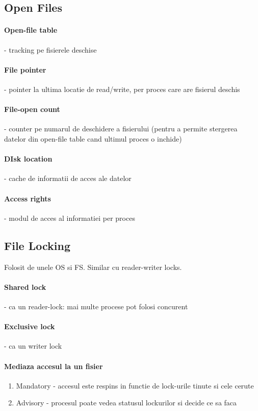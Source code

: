 \documentclass{article}
\begin{document}
\subsection*{Open Files}
\paragraph*{Open-file table} - tracking pe fisierele deschise
\paragraph*{File pointer} - pointer la ultima locatie de read/write, per proces care are fisierul deschis
\paragraph*{File-open count} - counter pe numarul de deschidere a fisierului (pentru a permite stergerea datelor din open-file table cand ultimul proces o inchide)
\paragraph*{DIsk location} - cache de informatii de acces ale datelor
\paragraph*{Access rights} - modul de acces al informatiei per proces

\subsection*{File Locking}
Folosit de unele OS si FS. Similar cu reader-writer locks.
\paragraph*{Shared lock} - ca un reader-lock: mai multe procese pot folosi concurent
\paragraph*{Exclusive lock} - ca un writer lock
\paragraph*{Mediaza accesul la un fisier}
\begin{enumerate}
    \item Mandatory - accesul este respins in functie de lock-urile tinute si cele cerute
    \item Advisory - procesul poate vedea statusul lockurilor si decide ce sa faca
\end{enumerate}
\end{document}
